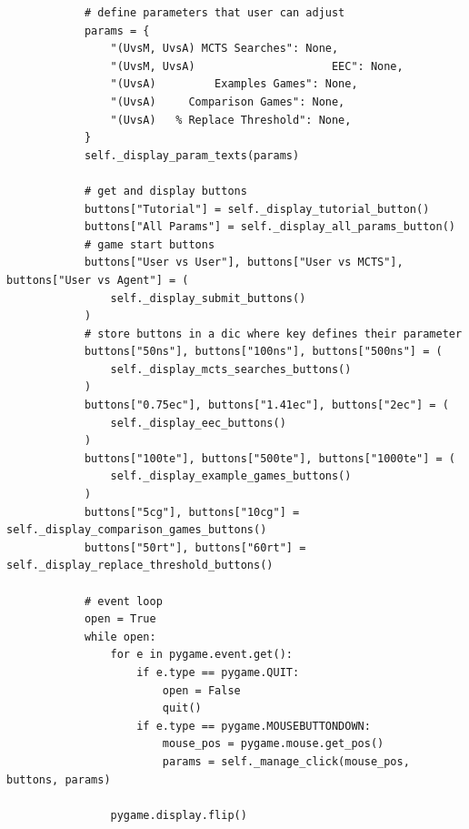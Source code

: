\documentclass{article}
\begin{document}
\begin{verbatim}
            # define parameters that user can adjust
            params = {
                "(UvsM, UvsA) MCTS Searches": None,
                "(UvsM, UvsA)                     EEC": None,
                "(UvsA)         Examples Games": None,
                "(UvsA)     Comparison Games": None,
                "(UvsA)   % Replace Threshold": None,
            }
            self._display_param_texts(params)

            # get and display buttons
            buttons["Tutorial"] = self._display_tutorial_button()
            buttons["All Params"] = self._display_all_params_button()
            # game start buttons
            buttons["User vs User"], buttons["User vs MCTS"], buttons["User vs Agent"] = (
                self._display_submit_buttons()
            )
            # store buttons in a dic where key defines their parameter
            buttons["50ns"], buttons["100ns"], buttons["500ns"] = (
                self._display_mcts_searches_buttons()
            )
            buttons["0.75ec"], buttons["1.41ec"], buttons["2ec"] = (
                self._display_eec_buttons()
            )
            buttons["100te"], buttons["500te"], buttons["1000te"] = (
                self._display_example_games_buttons()
            )
            buttons["5cg"], buttons["10cg"] = self._display_comparison_games_buttons()
            buttons["50rt"], buttons["60rt"] = self._display_replace_threshold_buttons()

            # event loop
            open = True
            while open:
                for e in pygame.event.get():
                    if e.type == pygame.QUIT:
                        open = False
                        quit()
                    if e.type == pygame.MOUSEBUTTONDOWN:
                        mouse_pos = pygame.mouse.get_pos()
                        params = self._manage_click(mouse_pos, buttons, params)

                pygame.display.flip()


\end{verbatim}
\end{document}

